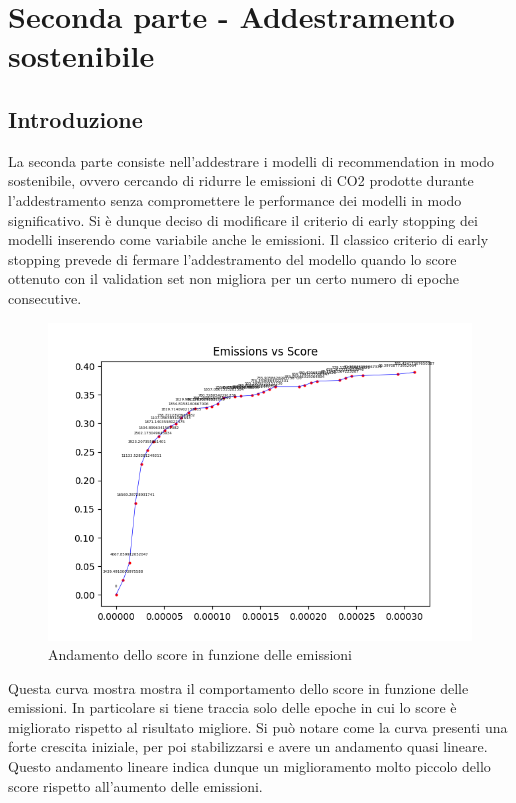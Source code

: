 \section{Seconda parte - Addestramento sostenibile}
\subsection{Introduzione}
La seconda parte consiste nell'addestrare i modelli di recommendation in modo sostenibile, ovvero cercando di ridurre le emissioni di CO2 prodotte durante l'addestramento senza compromettere le performance dei modelli in modo significativo.
Si è dunque deciso di modificare il criterio di early stopping dei modelli inserendo come variabile anche le emissioni.
Il classico criterio di early stopping prevede di fermare l'addestramento del modello quando lo score ottenuto con il validation set non migliora per un certo numero di epoche consecutive.


\begin{figure}[H]
    \centering
     \includegraphics[width=\textwidth]{images/curve_emissions_score.png}
    \caption{Andamento dello score in funzione delle emissioni}
\end{figure}

\noindent Questa curva mostra mostra il comportamento dello score in funzione delle emissioni. In particolare si tiene traccia solo delle epoche in cui lo score è migliorato rispetto al risultato migliore.
Si può notare come la curva presenti una forte crescita iniziale, per poi stabilizzarsi e avere un andamento quasi lineare.
Questo andamento lineare indica dunque un miglioramento molto piccolo dello score rispetto all'aumento delle emissioni.


